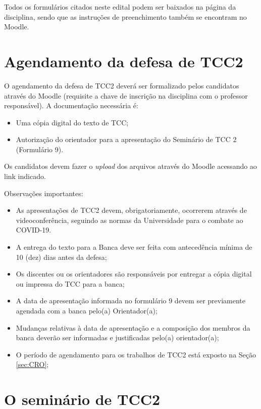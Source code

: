 \documentclass[a4paper, 12pt]{article}
\begin{document}
    Todos os formulários citados neste edital podem ser baixados na página da disciplina, sendo que as instruções de preenchimento também se encontram no Moodle.
    
   \section{Agendamento da defesa de TCC2}

    O agendamento da defesa de TCC2 deverá ser formalizado pelos candidatos através do Moodle (requisite a chave de inscrição na disciplina com o professor responsável). A documentação necessária é:
    
    \begin{itemize}
    	\item Uma cópia digital do texto de TCC;
    	\item Autorização do orientador para a apresentação do Seminário de TCC 2 (Formulário 9).
    \end{itemize}

	Os candidatos devem fazer o \textit{upload} dos arquivos através do Moodle acessando ao link indicado.
		
    Observações importantes:
    
    \begin{itemize}
    	\item As apresentações de TCC2 devem, obrigatoriamente, ocorrerem através de videoconferência, seguindo as normas da Universidade para o combate ao COVID-19.
    	\item A entrega do texto para a Banca deve ser feita com antecedência mínima de 10 (dez) dias antes da defesa;
    	\item Os discentes ou os orientadores são responsáveis por entregar a cópia digital ou impressa do TCC para a banca;
    	\item A data de apresentação informada no formulário 9 devem ser previamente agendada com a banca pelo(a) Orientador(a);    	
    	\item Mudanças relativas à data de apresentação e a composição dos membros da banca deverão ser informadas e justificadas pelo(a) orientador(a);
    	\item O período de agendamento para os trabalhos de TCC2 está exposto na Seção \ref{sec:CRO};
    \end{itemize}

	\section{O seminário de TCC2}
	
\end{document}
